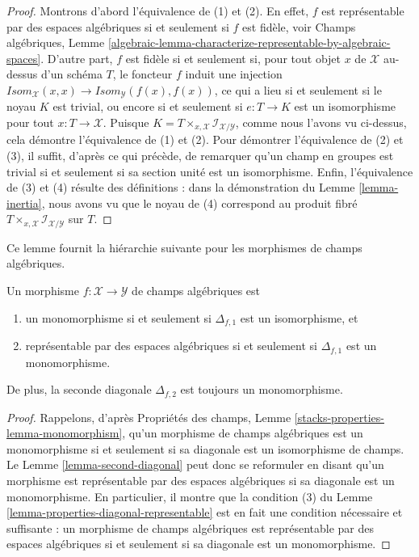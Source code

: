 \begin{proof}
Montrons d'abord l'équivalence de (1) et (2). En effet, $f$ est représentable
par des espaces algébriques si et seulement si $f$ est fidèle, voir Champs
algébriques, Lemme
\ref{algebraic-lemma-characterize-representable-by-algebraic-spaces}.
D'autre part, $f$ est fidèle si et seulement si, pour tout objet $x$ de
$\mathcal{X}$ au-dessus d'un schéma $T$, le foncteur $f$ induit une injection
$\mathit{Isom}_\mathcal{X}(x, x) \to
\mathit{Isom}_\mathcal{Y}(f(x), f(x))$,
ce qui a lieu si et seulement si le noyau $K$ est trivial, ou encore si et
seulement si $e : T \to K$ est un isomorphisme pour tout
$x : T \to \mathcal{X}$. Puisque
$K = T \times_{x, \mathcal{X}} \mathcal{I}_{\mathcal{X}/\mathcal{Y}}$,
comme nous l'avons vu ci-dessus, cela démontre l'équivalence de (1) et (2).
Pour démontrer l'équivalence de (2) et (3), il suffit, d'après ce qui précède,
de remarquer qu'un champ en groupes est trivial si et seulement si sa section
unité est un isomorphisme. Enfin, l'équivalence de (3) et (4) résulte des
définitions : dans la démonstration du Lemme \ref{lemma-inertia}, nous avons
vu que le noyau de (4) correspond au produit fibré
$T \times_{x, \mathcal{X}} \mathcal{I}_{\mathcal{X}/\mathcal{Y}}$ sur $T$.
\end{proof}

\noindent
Ce lemme fournit la hiérarchie suivante pour les morphismes de champs
algébriques.

\begin{lemma}
\label{lemma-hierarchy}
Un morphisme $f : \mathcal{X} \to \mathcal{Y}$ de champs algébriques est
\begin{enumerate}
\item un monomorphisme si et seulement si $\Delta_{f, 1}$ est un
isomorphisme, et
\item représentable par des espaces algébriques si et seulement si
$\Delta_{f, 1}$ est un monomorphisme.
\end{enumerate}
De plus, la seconde diagonale $\Delta_{f, 2}$ est toujours un monomorphisme.
\end{lemma}

\begin{proof}
Rappelons, d'après Propriétés des champs, Lemme
\ref{stacks-properties-lemma-monomorphism}, qu'un morphisme de champs
algébriques est un monomorphisme si et seulement si sa diagonale est un
isomorphisme de champs. Le Lemme \ref{lemma-second-diagonal} peut donc se
reformuler en disant qu'un morphisme est représentable par des espaces
algébriques si sa diagonale est un monomorphisme. En particulier, il montre
que la condition (3) du Lemme
\ref{lemma-properties-diagonal-representable} est en fait une condition
nécessaire et suffisante : un morphisme de champs algébriques est
représentable par des espaces algébriques si et seulement si sa diagonale
est un monomorphisme.
\end{proof}

